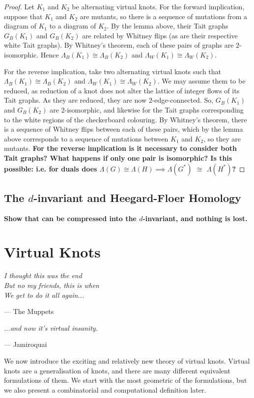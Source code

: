 \documentclass[12pt]{report}
\newcommand{\notered}[1]{{\color{Red} \textbf{#1}}}
\newcommand{\notegreen}[1]{{\color{Green} \textbf{#1}}}
\begin{document}
\begin{proof}
Let $K_{1}$ and $K_{2}$ be alternating virtual knots. For the forward implication, suppose that $K_{1}$ and $K_{2}$ are mutants, so there is a sequence of mutations from a diagram of $K_{1}$ to a diagram of $K_{2}$. By the lemma above, their Tait graphs $G_{B}(K_{1})$ and $G_{B}(K_{2})$  are related by Whitney flips (as are their respective white Tait graphs). By Whitney's theorem, each of these pairs of graphs are $2$-isomorphic. Hence $\Lambda_{B}(K_{1}) \cong \Lambda_{B}(K_{2})$ and $\Lambda_{W}(K_{1}) \cong \Lambda_{W}(K_{2})$.

For the reverse implication, take two alternating virtual knots such that $\Lambda_{B}(K_{1}) \cong \Lambda_{B}(K_{2})$ and $\Lambda_{W}(K_{1}) \cong \Lambda_{W}(K_{2})$. We may assume them to be reduced, as reduction of a knot does not alter the lattice of integer flows of its Tait graphs. As they are reduced, they are now $2$-edge-connected. So, $G_{B}(K_{1})$ and $G_{B}(K_{2})$ are $2$-isomorphic, and likewise for the Tait graphs corresponding to the white regions of the checkerboard colouring. By Whitney's theorem, there is a sequence of Whitney flips between each of these pairs, which by the lemma above corresponds to a sequence of mutations between $K_{1}$ and $K_{2}$, so they are mutants. \notered{For the reverse implication is it necessary to consider both Tait graphs? What happens if only one pair is isomorphic? Is this possible: i.e. for duals does $\Lambda(G) \cong \Lambda(H) \implies \Lambda(G^{*})$ $\cong$ $\Lambda(H^{*})$?}
\end{proof}

\section{\notegreen{The $d$-invariant and Heegard-Floer Homology}}
\notegreen{Show that can be compressed into the $d$-invariant, and nothing is lost.}

\chapter{Virtual Knots}

\epigraph{\itshape I thought this was the end\\But no my friends, this is when\\We get to do it all again...}{--- The Muppets}
\epigraph{\itshape ...and now it's virtual insanity.}{--- Jamiroquai}


We now introduce the exciting and relatively new theory of virtual knots. Virtual knots are a generalisation of knots, and there are many different equivalent formulations of them. We start with the most geometric of the formulations, but we also present a combinatorial and computational definition later.
\end{document}
